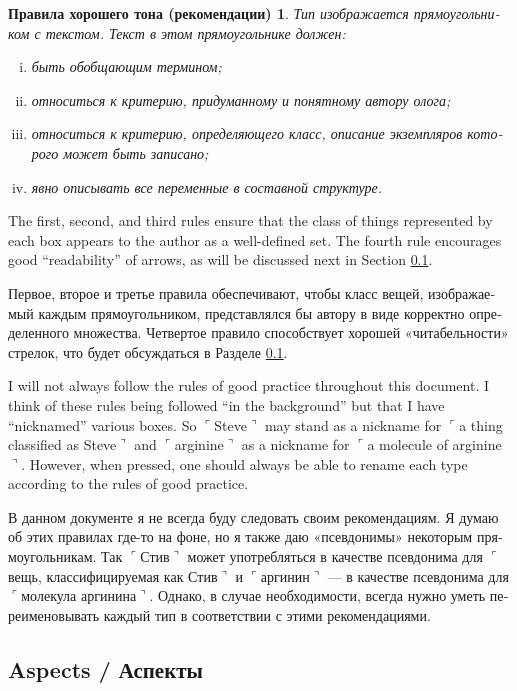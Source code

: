 \documentclass[a4paper]{book}
\def\tn{\textnormal}
\newcommand{\fakebox}[1]{\tn{$\ulcorner$#1$\urcorner$}}
\theoremstyle{myth}
\newtheorem{rulesRUS}[envRUS]{Правила хорошего тона (рекомендации)}
\begin{document}
\begin{russian}
\begin{rulesRUS}\label{rules:types}
 Тип изображается прямоугольником с текстом. Текст в этом прямоугольнике должен:
\begin{enumerate}[(i)]
\item быть обобщающим термином;
\item относиться к критерию, придуманному и понятному автору олога;
\item относиться к критерию, определяющего класс, описание экземпляров которого может быть записано;
\item явно описывать все переменные в составной структуре. 
\end{enumerate}
\end{rulesRUS}

The first, second, and third rules ensure that the class of things represented by each box appears to the author as a well-defined set.  The fourth rule encourages good “readability” of arrows, as will be discussed next in Section \ref{sec:aspects}.  

Первое, второе и третье правила обеспечивают, чтобы класс вещей, изображаемый каждым прямоугольником, представлялся бы автору в виде корректно определенного множества.  Четвертое правило способствует хорошей «читабельности» стрелок, что будет обсуждаться в Разделе \ref{sec:aspects}.

I will not always follow the rules of good practice throughout this document.  I think of these rules being followed “in the background” but that I have “nicknamed” various boxes.  So \fakebox{Steve} may stand as a nickname for \fakebox{a thing classified as Steve} and \fakebox{arginine} as a nickname for \fakebox{a molecule of arginine}. However, when pressed, one should always be able to rename each type according to the rules of good practice.

В данном документе я не всегда буду следовать своим рекомендациям. Я думаю об этих правилах где-то на фоне, но я также даю «псевдонимы» некоторым прямоугольникам.  Так \fakebox{Стив} может употребляться в качестве псевдонима для \fakebox{вещь, классифицируемая как Стив} и \fakebox{аргинин} — в качестве псевдонима для \fakebox{молекула аргинина}. Однако, в случае необходимости, всегда нужно уметь переименовывать каждый тип в соответствии с этими рекомендациями. 


\subsection{Aspects / Аспекты}\label{sec:aspects}


\end{russian}
\end{document}
